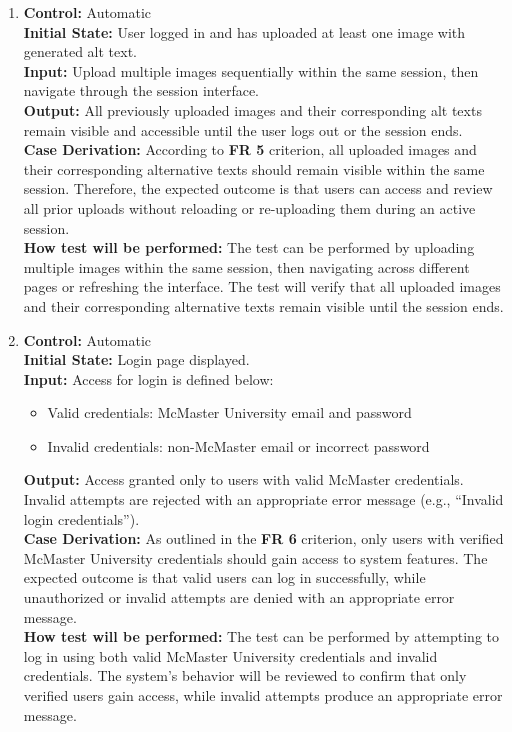 \documentclass[12pt, titlepage]{article}
\begin{document}
\begin{enumerate}[label=FR-ST \arabic*., wide=0pt, leftmargin=*]
  \item{}
    {\bf Control:} Automatic\\
    {\bf Initial State:} User logged in and has uploaded at least one
    image with generated alt text.\\
    {\bf Input:} Upload multiple images sequentially within the same
    session, then navigate through the session interface.\\
    {\bf Output:} All previously uploaded images and their
    corresponding alt texts remain visible and accessible until the
    user logs out or the session ends.\\
    {\bf  Case Derivation:} According to \textbf{FR 5} criterion, all
    uploaded images and their corresponding alternative texts should
    remain visible within the same session. Therefore, the expected
    outcome is that users can access and review all prior uploads
    without reloading or re-uploading them during an active session.\\
    {\bf How test will be performed:} The test can be performed by
    uploading multiple images within the same session, then
    navigating across different pages or refreshing the interface.
    The test will verify that all uploaded images and their
    corresponding alternative texts remain visible until the session ends.\\

  \item{}
    {\bf Control:} Automatic\\
    {\bf Initial State:} Login page displayed.\\
    {\bf Input:} Access for login is defined below:
    \begin{itemize}
      \item Valid credentials: McMaster University email and password
      \item Invalid credentials: non-McMaster email or incorrect password
    \end{itemize}
    {\bf Output:} Access granted only to users with valid McMaster
    credentials. Invalid attempts are rejected with an appropriate
    error message (e.g., “Invalid login credentials”).\\
    {\bf  Case Derivation:} As outlined in the \textbf{FR 6}
    criterion, only users with verified McMaster University
    credentials should gain access to system features. The expected
    outcome is that valid users can log in successfully, while
    unauthorized or invalid attempts are denied with an appropriate
    error message.\\
    {\bf How test will be performed:} The test can be performed by
    attempting to log in using both valid McMaster University
    credentials and invalid credentials. The system’s behavior will
    be reviewed to confirm that only verified users gain access,
    while invalid attempts produce an appropriate error message.\\
\end{enumerate}
\end{document}
